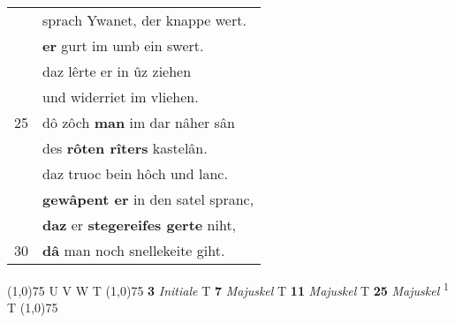 \documentclass[8pt,a4paper,notitlepage]{article}
\begin{document}
\begin{table}[ht]
\begin{minipage}[t]{0.5\linewidth}
\begin{tabular}{rl}
 & sprach Ywanet, der knappe wert.\\ 
 & \textbf{er} gurt im umb ein swert.\\ 
 & daz lêrte er in ûz ziehen\\ 
 & und widerriet im vliehen.\\ 
25 & dô zôch \textbf{man} im dar nâher sân\\ 
 & des \textbf{rôten rîters} kastelân.\\ 
 & daz truoc bein hôch und lanc.\\ 
 & \textbf{gewâpent er} in den satel spranc,\\ 
 & \textbf{daz} er \textbf{stegereifes gerte} niht,\\ 
30 & \textbf{dâ} man noch snellekeite giht.\\ 
\end{tabular}
\scriptsize
\line(1,0){75} \newline
U V W T \newline
\line(1,0){75} \newline
\textbf{3} \textit{Initiale} T  \textbf{7} \textit{Majuskel} T  \textbf{11} \textit{Majuskel} T  \textbf{25} \textit{Majuskel} \textsuperscript{1}\hspace{-1.3mm} T  \newline
\line(1,0){75} \newline

\end{minipage}
\end{table}
\end{document}
